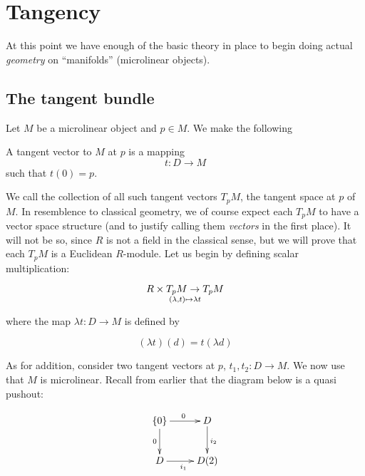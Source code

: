 \chapter{Tangency}

At this point we have enough of the basic theory in place to begin doing actual \emph{geometry} on ``manifolds'' (microlinear objects).

\section{The tangent bundle}

Let \( M \) be a microlinear object and \( p\in M \). We make the following

\begin{defn}
  A tangent vector to \( M \) at \( p \) is a mapping 
  \begin{equation*}
    t:D\to M
  \end{equation*}
  such that \( t(0)=p \).
\end{defn}

We call the collection of all such tangent vectors \( T_pM \), the tangent space at \( p \) of \( M \). In resemblence to classical geometry, we of course expect each \( T_pM \) to have a vector space structure (and to justify calling them \emph{vectors} in the first place). It will not be so, since \( R \) is not a field in the classical sense, but we will prove that each \( T_pM \) is a Euclidean \( R \)-module. Let us begin by defining scalar multiplication:

\begin{equation*}
  R\times T_pM \to T_pM \atop (\lambda,t)\mapsto \lambda t
\end{equation*}

where the map \( \lambda t: D\to M \) is defined by

\begin{equation*}
  (\lambda t)(d) = t(\lambda d)
\end{equation*}

As for addition, consider two tangent vectors at \( p \), \( t_1,t_2:D\to M \). We now use that \( M \) is microlinear. Recall from earlier that the diagram below is a quasi pushout:

\begin{equation}
  \xymatrix{
    {\{0\}} \ar[d]_0 \ar[r]^0   & D \ar[d]^{i_2} \\
    D \ar[r]_{i_1}              & D(2)
  }
  \label{dg:pushoutcopy}
\end{equation}

